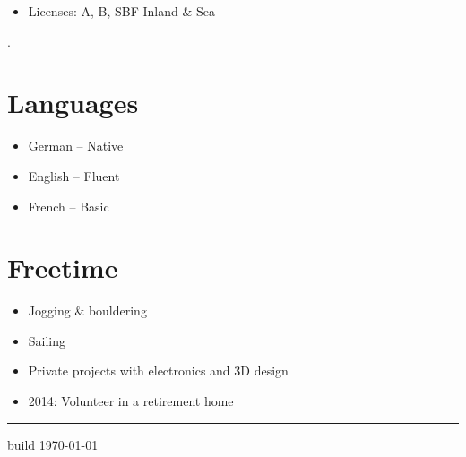 \documentclass[a4paper,11pt]{article}
\newcommand{\col}[2]{\textcolor[HTML]{#1}{#2}}
\begin{document}
\begin{minipage}[t]{0.65\textwidth}
\begin{minipage}[t]{0.625\textwidth}
\begin{itemize}
            \item Licenses: A, B, SBF Inland \& Sea
        \end{itemize}
    \end{minipage}
    \hfill
    \begin{minipage}[t]{0.325\textwidth}
        \col{ffffff}{.} %
        \section*{\col{7690bb}{Languages}}
        \begin{itemize}
            \small
            \item German -- Native
            \item English -- Fluent
            \item French -- Basic
        \end{itemize}

        \section*{\col{6187bd}{Freetime}}
        \begin{itemize}
            \small
            \item Jogging \& bouldering
            \item Sailing
            \item Private projects with electronics and 3D design
            \item 2014: Volunteer in a retirement home
        \end{itemize}
    \end{minipage}

\end{minipage}

\vfill
\hfill
\vspace{0.17cm}
\begin{minipage}[t]{0.65\textwidth}
    \hrule
    \vspace{0.125cm}

    \small build \href{\giturl}{\texttt{\gitcommit}} \hfill \today
\end{minipage}
\end{document}
